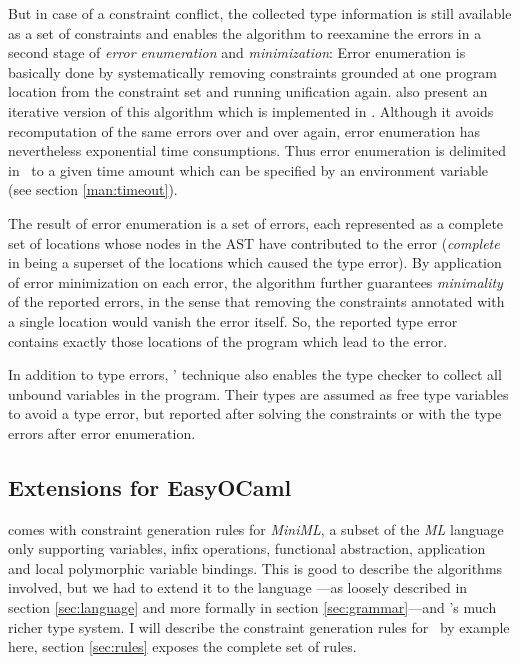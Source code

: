 But in case of a constraint conflict, the collected type information is still
available as a set of constraints and enables the algorithm to reexamine the
errors in a second stage of \emph{error enumeration} and \emph{minimization}:
Error enumeration is basically done by systematically removing constraints
grounded at one program location from the constraint set and running unification
again.
\citet{haackwells04} also present an iterative version of this algorithm which
is implemented in \easyocaml. Although it avoids recomputation of the same
errors over and over again, error enumeration has nevertheless exponential time
consumptions. Thus error enumeration is delimited in \easyocaml\ to a given time
amount which can be specified by an environment variable (see section
\ref{man:timeout}).

The result of error enumeration is a set of errors, each represented as a
complete set of locations whose nodes in the AST have contributed to the error
(\emph{complete} in being a superset of the locations which caused the type
error). By application of error minimization on each error, the algorithm
further guarantees \emph{minimality} of the reported errors, in the sense that
removing the constraints annotated with a single location would vanish the error
itself.
So, the reported type error contains exactly those locations of the program
which lead to the error.

In addition to type errors, \citeauthor{haackwells04}' technique also enables the 
type checker to collect all unbound variables in the program.
Their types are assumed as free type variables to avoid a type error, but
reported after solving the constraints or with the type errors after error
enumeration.


\subsection{Extensions for EasyOCaml}
\label{sec:extending}

\citet{haackwells04} comes with constraint generation rules for
\textsl{MiniML}, a subset of the \textsl{ML} language only supporting
variables, infix operations, functional abstraction, application and local
polymorphic variable bindings.
This is good to describe the algorithms involved, but we had to extend it to the
language \camlm---as loosely described in section \ref{sec:language} and more
formally in section \ref{sec:grammar}---and \easyocaml's much richer type
system.
I will describe the constraint generation rules for \easyocaml\ by example
here, section \ref{sec:rules} exposes the complete set of rules.

